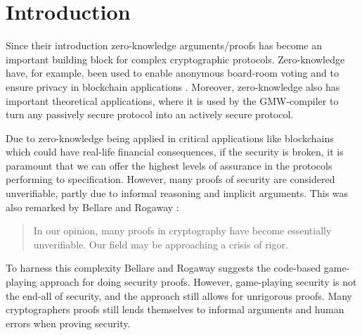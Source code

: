 \chapter{Introduction}
\label{ch:intro}
Since their introduction zero-knowledge arguments/proofs has become
an important building block for complex cryptographic protocols.
Zero-knowledge have, for example, been used to enable anonymous board-room
voting \cite{boardroom-voting} and to ensure privacy in blockchain applications \cite{concordium}.
Moreover, zero-knowledge also has important theoretical applications, where it
is used by the GMW-compiler to turn any passively secure protocol into an
actively secure protocol.

Due to zero-knowledge being applied in critical applications like
blockchains which could have real-life financial consequences, if the security is
broken, it is paramount that we can offer the highest levels of assurance in the
protocols performing to specification.
However, many proofs of security are considered unverifiable, partly due to informal
reasoning and implicit arguments. This was also remarked by Bellare and Rogaway \cite{game-playing}:

\begin{quote}
In our opinion, many proofs in cryptography have become essentially unverifiable. Our field may be approaching a crisis of rigor.
\end{quote}

To harness this complexity Bellare and Rogaway suggests the code-based game-playing approach
for doing security proofs.
However, game-playing security is not the end-all of security, and the approach
still allows for unrigorous proofs. Many cryptographers proofs still lends
themselves to informal arguments and human errors when proving security.

